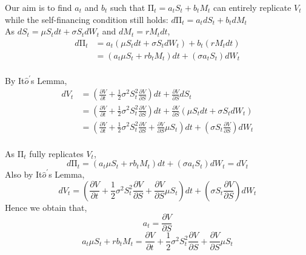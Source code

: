 \begin{center}
Our aim is to find $a_{t}$ and $b_{t}$ such that $\mathrm{\Pi}_{t} = a_{t}S_{t} + b_{t}M_{t}$ can entirely replicate $V_{t}$\\[2mm]
while the self-financing condition still holds: $d\mathrm{\Pi}_{t} = a_{t}dS_{t} + b_{t}dM_{t}$\\[5mm]
As $dS_{t} = \mu S_{t}dt + \sigma S_{t}dW_{t}$ and $dM_{t}  = rM_{t}dt$,
\begin{equation*}
\begin{split}
d\mathrm{\Pi}_{t} 
&= a_{t}(\mu S_{t}dt + \sigma S_{t}dW_{t}) + b_{t}(rM_{t}dt)\\
&= (a_{t}\mu S_{t} + rb_{t}M_{t})dt + (\sigma a_{t}S_{t})dW_{t}\\
\end{split}
\end{equation*}
\end{center}

\begin{center}
By It$\hat{o}^{\prime}$s Lemma, 
\begin{equation*}
\begin{split}
dV_{t}
&= (\frac{\partial V}{\partial t}+\frac{1}{2}\sigma^{2}S_{t}^{2}\frac{\partial V}{\partial S})dt + \frac{\partial V}{\partial S}dS_{t}\\
&= (\frac{\partial V}{\partial t}+\frac{1}{2}\sigma^{2}S_{t}^{2}\frac{\partial V}{\partial S})dt + \frac{\partial V}{\partial S}(\mu S_{t}dt + \sigma S_{t}dW_{t})\\
&= (\frac{\partial V}{\partial t}+\frac{1}{2}\sigma^{2}S_{t}^{2}\frac{\partial V}{\partial S}+\frac{\partial V}{\partial S}\mu S_{t})dt + (\sigma S_{t}\frac{\partial V}{\partial S})dW_{t}\\
\end{split}
\end{equation*}
\end{center}

\begin{center}
As $\mathrm{\Pi}_{t}$ fully replicates $V_{t}$,
$$d\mathrm{\Pi}_{t} = (a_{t}\mu S_{t} + rb_{t}M_{t})dt + (\sigma a_{t}S_{t})dW_{t} = dV_{t}$$
Also by It$\hat{o}^{\prime}$s Lemma, 
$$dV_{t} = (\frac{\partial V}{\partial t}+\frac{1}{2}\sigma^{2}S_{t}^{2}\frac{\partial V}{\partial S}+\frac{\partial V}{\partial S}\mu S_{t})dt + (\sigma S_{t}\frac{\partial V}{\partial S})dW_{t}$$
Hence we obtain that,
$$a_{t} = \frac{\partial V}{\partial S}$$
$$a_{t}\mu S_{t} + rb_{t}M_{t} = \frac{\partial V}{\partial t}+\frac{1}{2}\sigma^{2}S_{t}^{2}\frac{\partial V}{\partial S}+\frac{\partial V}{\partial S}\mu S_{t}$$
\end{center}

